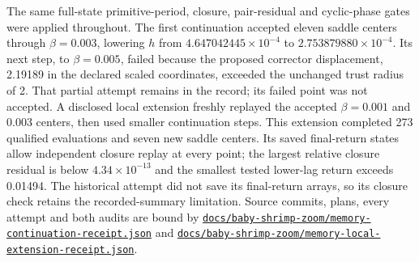 \documentclass[11pt,letterpaper]{article}
\newcommand{\repourl}{https://github.com/tdj28/neural-shrimp}
\newcommand{\memoryrepo}[1]{\href{\repourl/blob/d2a15964bdae9358ad2dbc363980a10294b2cb2e/#1}{\nolinkurl{#1}}}
\begin{document}
The same full-state primitive-period, closure, pair-residual and cyclic-phase gates were applied throughout.
The first continuation accepted eleven saddle centers through $\beta=0.003$, lowering $h$ from
$4.647042445\times10^{-4}$ to $2.753879880\times10^{-4}$. Its next step, to $\beta=0.005$, failed because the
proposed corrector displacement, 2.19189 in the declared scaled coordinates, exceeded the unchanged trust radius
of 2. That partial attempt remains in the record; its failed point was not accepted. A disclosed local extension
freshly replayed the accepted $\beta=0.001$ and 0.003 centers, then used smaller continuation steps. This extension
completed 273 qualified evaluations and seven new saddle centers. Its saved final-return states allow independent
closure replay at every point; the largest relative closure residual is below $4.34\times10^{-13}$ and the
smallest tested lower-lag return exceeds 0.01494. The historical attempt did not save its final-return arrays, so
its closure check retains the recorded-summary limitation. Source commits, plans, every attempt and both audits
are bound by \memoryrepo{docs/baby-shrimp-zoom/memory-continuation-receipt.json} and
\memoryrepo{docs/baby-shrimp-zoom/memory-local-extension-receipt.json}.
\end{document}

